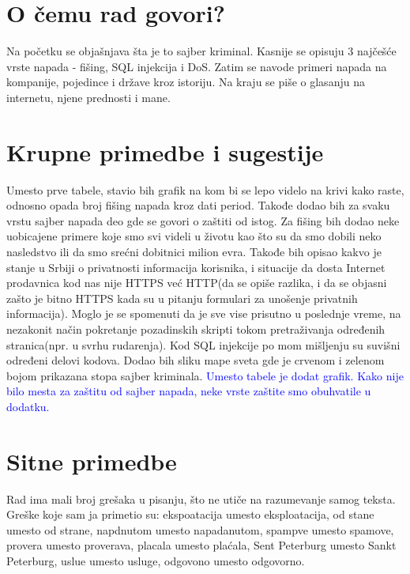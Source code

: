 \documentclass[a4paper]{report}
\newcommand{\odgovor}[1]{\textcolor{blue}{#1}}
\begin{document}
\section{O čemu rad govori?}
Na početku se objašnjava šta je to sajber kriminal. Kasnije se opisuju 3 najčešće vrste napada - fišing, SQL injekcija i DoS. Zatim se navode primeri napada na kompanije, pojedince i države kroz istoriju. Na kraju se piše o glasanju na internetu, njene prednosti i mane.

\section{Krupne primedbe i sugestije}

Umesto prve tabele, stavio bih grafik na kom bi se lepo videlo na krivi kako raste, odnosno opada broj fišing napada kroz dati period. Takođe dodao bih za svaku vrstu sajber napada deo gde se govori o zaštiti od istog. Za fišing bih dodao neke uobicajene primere koje smo svi videli u životu kao što su da smo dobili neko nasledstvo ili da smo srećni dobitnici milion evra. Takođe bih opisao kakvo je stanje u Srbiji o privatnosti informacija korisnika, i situacije da dosta Internet prodavnica kod nas nije HTTPS već HTTP(da se opiše razlika, i da se objasni zašto je bitno HTTPS kada su u pitanju formulari za unošenje privatnih informacija). Moglo je se spomenuti da je sve vise prisutno u poslednje vreme, na nezakonit način pokretanje pozadinskih skripti tokom pretraživanja određenih stranica(npr. u svrhu rudarenja). Kod SQL injekcije po mom mišljenju su suvišni određeni delovi kodova. Dodao bih sliku mape sveta gde je crvenom i zelenom bojom prikazana stopa sajber kriminala.
\odgovor{Umesto tabele je dodat grafik. Kako nije bilo mesta za zaštitu od sajber napada, neke vrste zaštite smo obuhvatile u dodatku.}

\section{Sitne primedbe}
Rad ima mali broj grešaka u pisanju, što ne utiče na razumevanje samog teksta. Greške koje sam ja primetio su: ekspoatacija umesto eksploatacija, od stane umesto od strane, napdnutom umesto napadanutom, spampve umesto spamove‚ provera umesto proverava, placala umesto plaćala, Sent Peterburg umesto Sankt Peterburg, uslue umesto usluge, odgovono umesto odgovorno.
\end{document}
